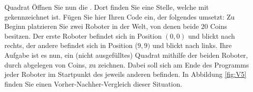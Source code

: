 \documentclass{../preamble}
\begin{document}
\begin{task}[credit = \stars{2}{3}]{Quadrat}
    Öffnen Sie nun die . Dort finden Sie eine Stelle, welche mit  gekennzeichnet ist. Fügen Sie hier Ihren Code ein, der folgendes umsetzt:
    \br
    Zu Beginn platzieren Sie zwei Roboter in der Welt, von denen beide \(20\) Coins besitzen. Der erste Roboter befindet sich in Position \((0,0)\) und blickt nach rechts, der andere befindet sich in Position (\(9, 9)\) und blickt nach links. Ihre Aufgabe ist es nun, ein (nicht ausgefülltes) Quadrat mithilfe der beiden Roboter, durch abgelegen von Coins, zu zeichnen. Dabei soll sich am Ende des Programms jeder Roboter im Startpunkt des jeweils anderen befinden. In Abbildung \ref{fig:V5} finden Sie einen Vorher-Nachher-Vergleich dieser Situation.

    \begin{figure}[h]
        \centering


\end{figure}
\end{task}
\end{document}

